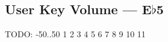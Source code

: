 \subsection{User Key Volume --- \UiKey{\I}\UiKey{\SET}E$\flat$5}









































TODO: -50..50
1
2
3
4
5
6
7
8
9
10
11
